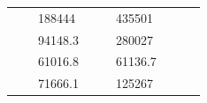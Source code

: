 \begin{table}[]
\begin{tabular}{|cclccllll}
\multicolumn{1}{|c|}{\cellcolor[HTML]{FFFFC7}}                                & \multicolumn{1}{c|}{\cellcolor[HTML]{DDFDFF}}                      & \multicolumn{1}{l|}{\cellcolor[HTML]{DAE8FC}188444}    & \multicolumn{1}{c|}{\cellcolor[HTML]{FFFFC7}}                                & \multicolumn{1}{c|}{\cellcolor[HTML]{DDFDFF}}                       & \multicolumn{1}{l|}{\cellcolor[HTML]{DDFDFF}435501}    &                                                                              &                                                                    &                                                        \\ \cline{3-3} \cline{6-6}
\multicolumn{1}{|c|}{\cellcolor[HTML]{FFFFC7}}                                & \multicolumn{1}{c|}{\cellcolor[HTML]{DDFDFF}}                      & \multicolumn{1}{l|}{\cellcolor[HTML]{DDFDFF}94148.3}   & \multicolumn{1}{c|}{\cellcolor[HTML]{FFFFC7}}                                & \multicolumn{1}{c|}{\cellcolor[HTML]{DDFDFF}}                       & \multicolumn{1}{l|}{\cellcolor[HTML]{DAE8FC}280027}    &                                                                              &                                                                    &                                                        \\ \cline{3-3} \cline{6-6}
\multicolumn{1}{|c|}{\cellcolor[HTML]{FFFFC7}}                                & \multicolumn{1}{c|}{\cellcolor[HTML]{DDFDFF}}                      & \multicolumn{1}{l|}{\cellcolor[HTML]{DAE8FC}61016.8}   & \multicolumn{1}{c|}{\cellcolor[HTML]{FFFFC7}}                                & \multicolumn{1}{c|}{\cellcolor[HTML]{DDFDFF}}                       & \multicolumn{1}{l|}{\cellcolor[HTML]{DDFDFF}61136.7}   &                                                                              &                                                                    &                                                        \\ \cline{3-3} \cline{6-6}
\multicolumn{1}{|c|}{\cellcolor[HTML]{FFFFC7}}                                & \multicolumn{1}{c|}{\cellcolor[HTML]{DDFDFF}}                      & \multicolumn{1}{l|}{\cellcolor[HTML]{DDFDFF}71666.1}   & \multicolumn{1}{c|}{\cellcolor[HTML]{FFFFC7}}                                & \multicolumn{1}{c|}{\cellcolor[HTML]{DDFDFF}}                       & \multicolumn{1}{l|}{\cellcolor[HTML]{DAE8FC}125267}    &                                                                              &                                                                    &                                                        \\ \cline{3-3} \cline{6-6}

\end{tabular}
\end{table}
